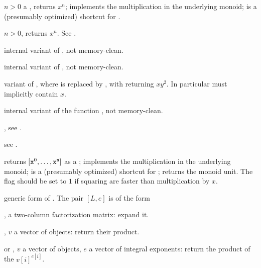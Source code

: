  $n > 0$ a
, returns $x^n$;  implements the multiplication
in the underlying monoid;  is a (presumably optimized) shortcut for
.

 $n > 0$,
returns $x^n$. See .

internal variant of , not memory-clean.

internal variant of , not memory-clean.

 variant
of , where  is replaced by , with
 returning $xy^2$. In particular  must implicitly
contain $x$.

internal variant of the function , not memory-clean.

, see
.

see .

returns $[{\tt x}^0, \dots, {\tt x}^{\tt n}]$ as a ;  implements the multiplication in the underlying monoid; 
is a (presumably optimized) shortcut for ; 
returns the monoid unit. The flag  should be set to $1$ if
squaring are faster than multiplication by $x$.

 generic form
of . The pair $[L,e]$ is of the form

\item \kbd{[fa, NULL]},  a two-column factorization matrix: expand it.

\item  \kbd{[v, NULL]}, $v$ a vector of objects: return their
product.

\item or \kbd{[v, e]},  $v$ a vector of objects, $e$ a vector of integral
exponents: return the product of the $v[i]^{e[i]}$.

